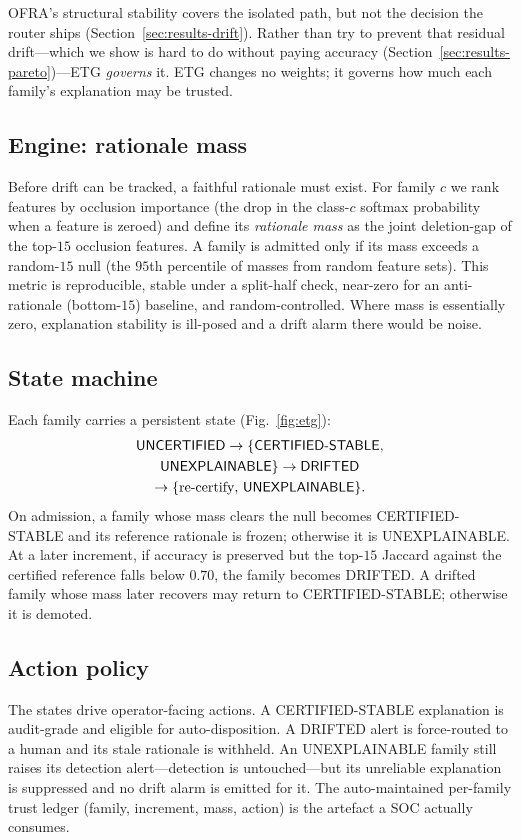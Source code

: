 \documentclass[conference]{IEEEtran}
\begin{document}
OFRA's structural stability covers the isolated path, but not the decision the
router ships (Section~\ref{sec:results-drift}). Rather than try to prevent that
residual drift---which we show is hard to do without paying accuracy
(Section~\ref{sec:results-pareto})---ETG \emph{governs} it. ETG changes no
weights; it governs how much each family's explanation may be trusted.

\subsection{Engine: rationale mass}
Before drift can be tracked, a faithful rationale must exist. For family $c$ we
rank features by occlusion importance (the drop in the class-$c$ softmax
probability when a feature is zeroed) and define its \emph{rationale mass} as the
joint deletion-gap of the top-$15$ occlusion features. A family is admitted only
if its mass exceeds a random-$15$ null (the $95$th percentile of masses from
random feature sets). This metric is reproducible, stable under a split-half
check, near-zero for an anti-rationale (bottom-$15$) baseline, and
random-controlled. Where mass is essentially zero, explanation stability is
ill-posed and a drift alarm there would be noise.

\subsection{State machine}
Each family carries a persistent state (Fig.~\ref{fig:etg}):
\[
\begin{gathered}
\textsf{UNCERTIFIED}\to\{\textsf{CERTIFIED\text{-}STABLE},\\
\textsf{UNEXPLAINABLE}\}\to\textsf{DRIFTED}\\
\to\{\text{re-certify},\,\textsf{UNEXPLAINABLE}\}.
\end{gathered}
\]
On admission, a family whose mass clears the null becomes
\textsf{CERTIFIED-STABLE} and its reference rationale is frozen; otherwise it is
\textsf{UNEXPLAINABLE}. At a later increment, if accuracy is preserved but the
top-$15$ Jaccard against the certified reference falls below $0.70$, the family
becomes \textsf{DRIFTED}. A drifted family whose mass later recovers may return
to \textsf{CERTIFIED-STABLE}; otherwise it is demoted.

\subsection{Action policy}
The states drive operator-facing actions. A \textsf{CERTIFIED-STABLE} explanation
is audit-grade and eligible for auto-disposition. A \textsf{DRIFTED} alert is
force-routed to a human and its stale rationale is withheld. An
\textsf{UNEXPLAINABLE} family still raises its detection alert---detection is
untouched---but its unreliable explanation is suppressed and no drift alarm is
emitted for it. The auto-maintained per-family trust ledger (family, increment,
mass, action) is the artefact a SOC actually consumes.
\end{document}

